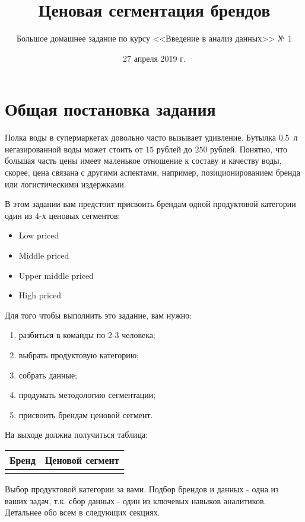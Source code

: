 \documentclass[12pt, a4paper, oneside]{article}
\title{Ценовая сегментация брендов}
\author{Большое домашнее задание по курсу <<Введение в анализ данных>> № 1}
\date{27 апреля 2019 г.}
\begin{document}
\maketitle

\tableofcontents

\section{Общая постановка задания}

Полка воды в супермаркетах довольно часто вызывает удивление. Бутылка $0.5$~л негазированной воды может стоить от $15$ рублей до $250$ рублей. Понятно, что большая часть цены имеет маленькое отношение к составу и качеству воды, скорее, цена связана с  другими аспектами, например, позиционированием бренда или логистическими издержками.

В этом задании вам предстоит присвоить брендам одной продуктовой категории один из $4$-х ценовых сегментов:

\begin{itemize}
\item  Low priced
\item  Middle priced
\item  Upper middle priced
\item  High priced
\end{itemize} 

Для того чтобы выполнить это задание, вам нужно:

\begin{enumerate} 
	\item  разбиться в команды по 2-3 человека;
	\item  выбрать продуктовую категорию;
	\item  собрать данные;
	\item  продумать методологию сегментации;
	\item  присвоить брендам ценовой сегмент.
\end{enumerate}

На выходе должна получиться таблица:

\begin{center}
\begin{tabular}{|c|c|}
	\hline 
	Бренд & Ценовой сегмент \\ 
	\hline 
	&  \\ 
	\hline 
\end{tabular} 
\end{center} 

Выбор продуктовой категории за вами.  Подбор брендов и данных - одна из ваших задач,  т.к. сбор данных - один из ключевых навыков аналитиков.  Детальнее обо всем в следующих секциях.
\end{document}
